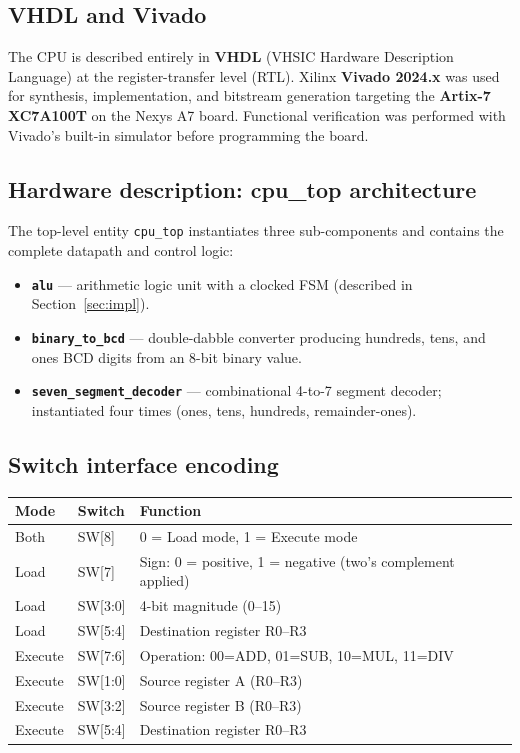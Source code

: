 \documentclass[11pt,a4paper]{article}
\begin{document}
\subsection{VHDL and Vivado}

The CPU is described entirely in \textbf{VHDL} (VHSIC Hardware Description
Language) at the register-transfer level (RTL). Xilinx \textbf{Vivado
2024.x} was used for synthesis, implementation, and bitstream generation
targeting the \textbf{Artix-7 XC7A100T} on the Nexys A7 board. Functional
verification was performed with Vivado's built-in simulator before programming
the board.

\subsection{Hardware description: cpu\_top architecture}

The top-level entity \texttt{cpu\_top} instantiates three sub-components and
contains the complete datapath and control logic:

\begin{itemize}[leftmargin=2em, noitemsep]
  \item \textbf{\texttt{alu}} — arithmetic logic unit with a clocked FSM
        (described in Section~\ref{sec:impl}).
  \item \textbf{\texttt{binary\_to\_bcd}} — double-dabble converter producing
        hundreds, tens, and ones BCD digits from an 8-bit binary value.
  \item \textbf{\texttt{seven\_segment\_decoder}} — combinational 4-to-7
        segment decoder; instantiated four times (ones, tens, hundreds,
        remainder-ones).
\end{itemize}

\subsection{Switch interface encoding}

\begin{center}
\begin{tabularx}{\linewidth}{C{2cm}C{2cm}L{8.5cm}}
  \toprule
  \textbf{Mode} & \textbf{Switch} & \textbf{Function} \\
  \midrule
  Both   & SW[8]     & 0 = Load mode, 1 = Execute mode \\
  Load   & SW[7]     & Sign: 0 = positive, 1 = negative (two's complement applied) \\
  Load   & SW[3:0]   & 4-bit magnitude (0–15) \\
  Load   & SW[5:4]   & Destination register R0–R3 \\
  Execute & SW[7:6]  & Operation: 00=ADD, 01=SUB, 10=MUL, 11=DIV \\
  Execute & SW[1:0]  & Source register A (R0–R3) \\
  Execute & SW[3:2]  & Source register B (R0–R3) \\
  Execute & SW[5:4]  & Destination register R0–R3 \\
  \bottomrule
\end{tabularx}
\end{center}
\end{document}
